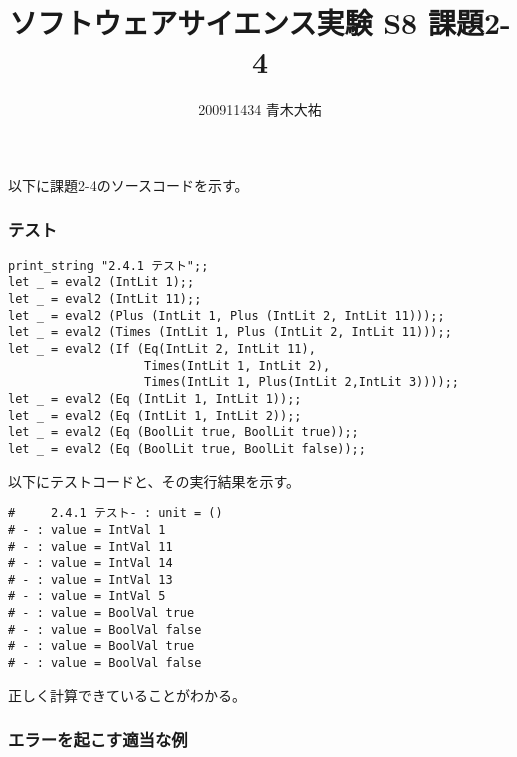 \documentclass[a4paper,9pt]{jarticle}
\title{ソフトウェアサイエンス実験 S8 課題2-4}
\author{200911434 青木大祐}
\begin{document}
\maketitle
\setcounter{section}{2}
\setcounter{subsection}{4}

\newpage
以下に課題2-4のソースコードを示す。

\newpage

\subsubsection{テスト}
\begin{lstlisting}
print_string "2.4.1 テスト";;
let _ = eval2 (IntLit 1);;
let _ = eval2 (IntLit 11);;
let _ = eval2 (Plus (IntLit 1, Plus (IntLit 2, IntLit 11)));;
let _ = eval2 (Times (IntLit 1, Plus (IntLit 2, IntLit 11)));;
let _ = eval2 (If (Eq(IntLit 2, IntLit 11),
                   Times(IntLit 1, IntLit 2),
                   Times(IntLit 1, Plus(IntLit 2,IntLit 3))));;
let _ = eval2 (Eq (IntLit 1, IntLit 1));;
let _ = eval2 (Eq (IntLit 1, IntLit 2));;
let _ = eval2 (Eq (BoolLit true, BoolLit true));;
let _ = eval2 (Eq (BoolLit true, BoolLit false));;
\end{lstlisting}

以下にテストコードと、その実行結果を示す。\\
\begin{lstlisting}
#     2.4.1 テスト- : unit = ()
# - : value = IntVal 1
# - : value = IntVal 11
# - : value = IntVal 14
# - : value = IntVal 13
# - : value = IntVal 5
# - : value = BoolVal true
# - : value = BoolVal false
# - : value = BoolVal true
# - : value = BoolVal false
\end{lstlisting}
正しく計算できていることがわかる。

\subsubsection{エラーを起こす適当な例}
\end{document}
